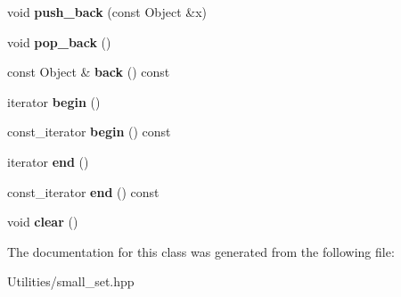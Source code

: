 \begin{DoxyCompactItemize}
\item 
\hypertarget{classutil_1_1small__vector_afa610a9f591fc6fe6042c140e276b3d1}{void {\bfseries push\+\_\+back} (const Object \&x)}\label{classutil_1_1small__vector_afa610a9f591fc6fe6042c140e276b3d1}

\item 
\hypertarget{classutil_1_1small__vector_a651aa829af8f49c249b9fe1ee80deff0}{void {\bfseries pop\+\_\+back} ()}\label{classutil_1_1small__vector_a651aa829af8f49c249b9fe1ee80deff0}

\item 
\hypertarget{classutil_1_1small__vector_a7ebdd270d81896fa6b4e1146f5dab815}{const Object \& {\bfseries back} () const }\label{classutil_1_1small__vector_a7ebdd270d81896fa6b4e1146f5dab815}

\item 
\hypertarget{classutil_1_1small__vector_aaa4d24a29dd41dfa97b7b9e0af5d76a9}{iterator {\bfseries begin} ()}\label{classutil_1_1small__vector_aaa4d24a29dd41dfa97b7b9e0af5d76a9}

\item 
\hypertarget{classutil_1_1small__vector_a38b84623331f61509a4423cda6f3943d}{const\+\_\+iterator {\bfseries begin} () const }\label{classutil_1_1small__vector_a38b84623331f61509a4423cda6f3943d}

\item 
\hypertarget{classutil_1_1small__vector_a4c2ac33728ce9859f734f9a584deb8fd}{iterator {\bfseries end} ()}\label{classutil_1_1small__vector_a4c2ac33728ce9859f734f9a584deb8fd}

\item 
\hypertarget{classutil_1_1small__vector_a53b63dfb4b3a14c80550adec359429f7}{const\+\_\+iterator {\bfseries end} () const }\label{classutil_1_1small__vector_a53b63dfb4b3a14c80550adec359429f7}

\item 
\hypertarget{classutil_1_1small__vector_a22d5fb17adce3e56b539aa41dafeb0df}{void {\bfseries clear} ()}\label{classutil_1_1small__vector_a22d5fb17adce3e56b539aa41dafeb0df}

\end{DoxyCompactItemize}


The documentation for this class was generated from the following file\+:\begin{DoxyCompactItemize}
\item 
Utilities/small\+\_\+set.\+hpp\end{DoxyCompactItemize}

